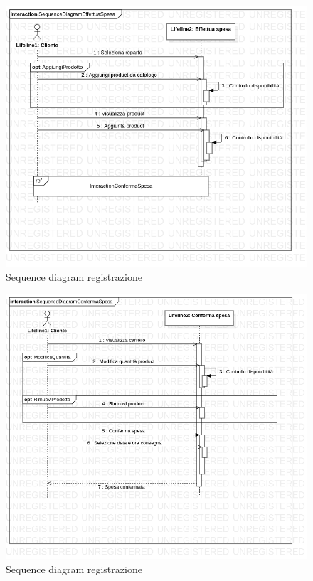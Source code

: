 \documentclass[12pt, a4paper]{article}
\numberwithin{equation}{section} %
\begin{document}
\begin{figure}[h]
\centering
\includegraphics[width=\textwidth]{Use Case Model!Effettua spesa!InteractionEffettuaSpesa!SequenceDiagramEffettuaSpesa_3.png}
\caption{Sequence diagram registrazione}
\end{figure}

\begin{figure}[h]
\centering
\includegraphics[width=\textwidth]{Use Case Model!Conferma spesa!InteractionConfermaSpesa!SequenceDiagramConfermaSpesa_13.png}
\caption{Sequence diagram registrazione}
\end{figure}
\end{document}

